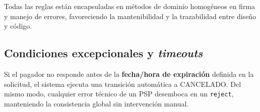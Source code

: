 Todas las reglas están encapsuladas en métodos de dominio homogéneos en firma y manejo de errores, favoreciendo la mantenibilidad y la trazabilidad entre diseño y código.

\subsection{Condiciones excepcionales y \emph{timeouts}}

Si el pagador no responde antes de la \textbf{fecha/hora de expiración} definida en la solicitud, el sistema ejecuta una transición automática a \textsc{CANCELADO}. Del mismo modo, cualquier error técnico de un PSP desemboca en un \texttt{reject}, manteniendo la consistencia global sin intervención manual.
%
%
%
%
%
